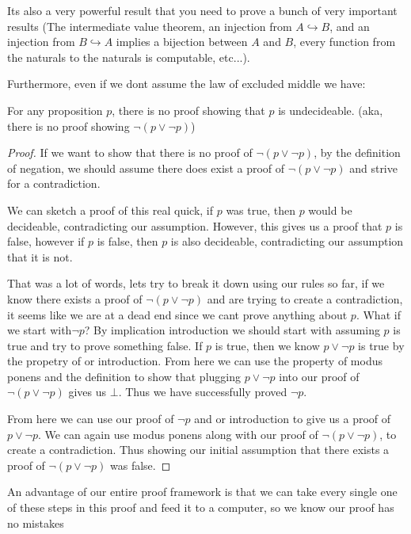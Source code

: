 Its also a very powerful result that you need to prove a bunch of very important results (The intermediate value theorem, an injection from $A \hookrightarrow B$, and an injection from $B \hookrightarrow A$ implies a bijection between $A$ and $B$, every function from the naturals to the naturals is computable, etc...).

Furthermore, even if we dont assume the law of excluded middle we have:

\begin{theorem}
    For any proposition $p$, there is no proof showing that $p$ is undecideable. (aka, there is no proof showing $\neg(p \lor \neg p)$)
\end{theorem}
\begin{proof}
    If we want to show that there is no proof of $\neg (p \lor \neg p)$, by the definition of negation, we should assume there does exist a proof of $\neg (p \lor \neg p)$ and strive for a contradiction.

    We can sketch a proof of this real quick, if $p$ was true, then $p$ would be decideable, contradicting our assumption. However, this gives us a proof that $p$ is false, however if $p$ is false, then $p$ is also decideable, contradicting our assumption that it is not.

    That was a lot of words, lets try to break it down using our rules so far, if we know there exists a proof of $\neg (p \lor \neg p)$ and are trying to create a contradiction, it seems like we are at a dead end since we cant prove anything about $p$. What if we start with$\neg p$? 
    By implication introduction we should start with assuming $p$ is true and try to prove something false. If $p$ is true, then we know $p \lor \neg p$ is true by the propetry of or introduction. From here we can use the property of modus ponens and the definition to show that plugging $p \lor \neg p$ into our proof of $\neg( p \lor \neg p)$ gives us $\bot$. Thus we have successfully proved $\neg p$.

    From here we can use our proof of $\neg p$ and or introduction to give us a proof of $p \lor \neg p$. We can again use modus ponens along with our proof of $\neg (p \lor \neg p)$, to create a contradiction. Thus showing our initial assumption that there exists a proof of $\neg (p \lor \neg p)$ was false.
\end{proof}
An advantage of our entire proof framework is that we can take every single one of these steps in this proof and feed it to a computer, so we know our proof has no mistakes

